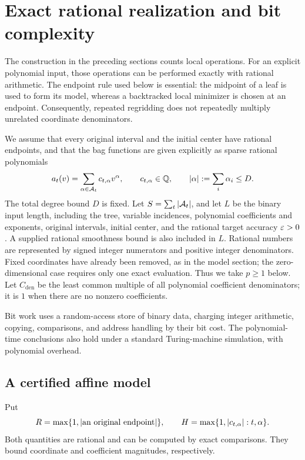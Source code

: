 \section{Exact rational realization and bit complexity}
\label{sec:arithmetic}

The construction in the preceding sections counts local operations.  For an
explicit polynomial input, those operations can be performed exactly with
rational arithmetic.  The endpoint rule used below is essential: the midpoint
of a leaf is used to form its model, whereas a backtracked local minimizer is
chosen at an endpoint.  Consequently, repeated regridding does not repeatedly
multiply unrelated coordinate denominators.

We assume that every original interval and the initial center have rational
endpoints, and that the bag functions are given explicitly as sparse rational
polynomials
\begin{equation}
 a_t(v)=\sum_{\alpha\in\mathcal A_t}c_{t,\alpha}v^\alpha,
 \qquad c_{t,\alpha}\in\mathbb Q,
 \qquad \left\lvert \alpha\right\rvert:=\sum_i\alpha_i\le D.
 \label{eq:arithmetic-polynomial}
\end{equation}
The total degree bound $D$ is fixed.  Let $S=\sum_t\left\lvert \mathcal A_t\right\rvert$, and let
$L$ be the binary input length, including the tree, variable incidences,
polynomial coefficients and exponents, original intervals, initial center,
and the rational target accuracy $\varepsilon>0$.  A supplied rational smoothness
bound is also included in $L$.  Rational numbers are represented by signed
integer numerators and positive integer denominators.  Fixed coordinates have
already been removed, as in the model section; the zero-dimensional case
requires only one exact evaluation.  Thus we take $p\ge1$ below.
Let $C_{\mathrm{den}}$ be the least common multiple of all polynomial
coefficient denominators; it is $1$ when there are no nonzero coefficients.

Bit work uses a random-access store of binary data, charging integer
arithmetic, copying, comparisons, and address handling by their bit cost.
The polynomial-time conclusions also hold under a standard Turing-machine
simulation, with polynomial overhead.

\subsection{A certified affine model}

Put
\[
 R=\max\{1,\left\lvert \text{an original endpoint}\right\rvert\},
 \qquad H=\max\{1,\left\lvert c_{t,\alpha}\right\rvert:t,\alpha\}.
\]
Both quantities are rational and can be computed by exact comparisons.  They
bound coordinate and coefficient magnitudes, respectively.

